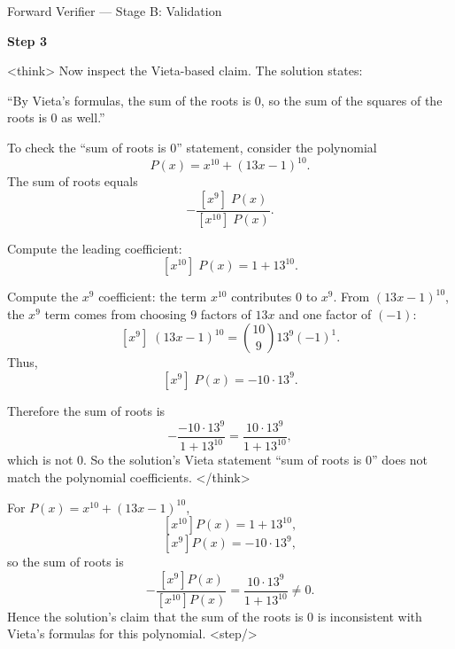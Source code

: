\documentclass[11pt]{article}
\begin{document}
\begin{exbox}{Forward Verifier — Stage B: Validation}

\textbf{Step 3}

<think>
Now inspect the Vieta-based claim. The solution states:

“By Vieta’s formulas, the sum of the roots is \(0\), so the sum of the squares of the roots is \(0\) as well.”

To check the “sum of roots is 0” statement, consider the polynomial
\[
P(x) = x^{10} + (13x - 1)^{10}.
\]
The sum of roots equals
\[
-\frac{[x^9]\;P(x)}{[x^{10}]\;P(x)}.
\]

Compute the leading coefficient:
\[
[x^{10}]\;P(x) = 1 + 13^{10}.
\]

Compute the \(x^9\) coefficient: the term \(x^{10}\) contributes \(0\) to \(x^9\).
From \((13x-1)^{10}\), the \(x^9\) term comes from choosing \(9\) factors of \(13x\) and one factor of \((-1)\):
\[
[x^9]\;(13x-1)^{10} = \binom{10}{9} 13^9 (-1)^{1}.
\]
Thus,
\[
[x^9]\;P(x) = -10\cdot 13^9.
\]

Therefore the sum of roots is
\[
-\frac{-10\cdot 13^9}{1+13^{10}} = \frac{10\cdot 13^9}{1+13^{10}},
\]
which is not \(0\).
So the solution’s Vieta statement “sum of roots is 0” does not match the polynomial coefficients.
</think>

For \(P(x)=x^{10}+(13x-1)^{10}\),
\[
[x^{10}]P(x)=1+13^{10},
\]
\[
[x^9]P(x)=-10\cdot 13^9,
\]
so the sum of roots is
\[
-\frac{[x^9]P(x)}{[x^{10}]P(x)}=\frac{10\cdot 13^9}{1+13^{10}}\neq 0.
\]
Hence the solution’s claim that the sum of the roots is \(0\) is inconsistent with Vieta’s formulas for this polynomial.
<step/>

\end{exbox}
\end{document}
